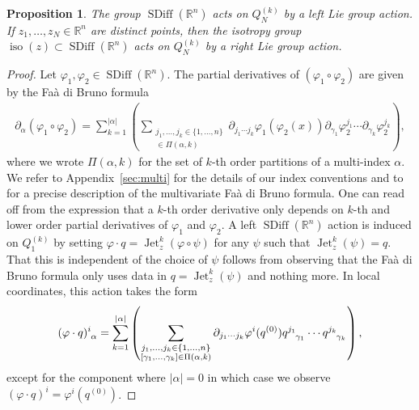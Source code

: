 \documentclass[12pt]{amsart}
\newcommand{\R}{\ensuremath{\mathbb{R}}}
\newtheorem{prop}[thm]{Proposition}
\DeclareMathOperator{\SDiff}{SDiff}
\DeclareMathOperator{\Jet}{Jet}
\DeclareMathOperator{\iso}{iso}
\begin{document}
  \begin{prop}
    The group $\SDiff(\R^n)$ acts on $Q_N^{(k)}$ by a left Lie group
    action.  If $z_1,\dots,z_N \in \R^n$ are distinct points,
    then the isotropy group $\iso(z) \subset \SDiff(\R^n)$
    acts on $Q_N^{(k)}$ by a right Lie group action. \label{HL_action_prop}
  \end{prop}
  \begin{proof}
    Let $\varphi_1,\varphi_2 \in \SDiff(\R^n)$.
    The partial derivatives of $(\varphi_1 \circ \varphi_2)$
    are given by the Fa\`a di Bruno formula
    \begin{align*}
      \partial_\alpha( \varphi_1 \circ \varphi_2) = \sum_{k=1}^{|\alpha|}
      \left(
        \sum_{
        \substack{
          j_1,\dots,j_k \in \{1,\dots,n\} \\
          [\gamma_1,\dots,\gamma_k] \in \Pi(\alpha , k)
          }
          }
          \partial_{j_1 \cdots j_k} \varphi_1(\varphi_2(x))
          \partial_{\gamma_1} \varphi_2^{j_1} \cdots
          \partial_{\gamma_k} \varphi_2^{j_k}
        \right),
    \end{align*}
where we wrote $\Pi(\alpha, k)$ for the set of $k$-th order partitions of a multi-index $\alpha$. We refer to Appendix~\ref{sec:multi} for the details of our index conventions and to \cite{ConstantineSavits1996,Jacobs2014b} for a
    precise description of the multivariate Fa\`a di Bruno formula.
    One can read off   from the expression that
    a $k$-th order derivative only depends on $k$-th 
    and lower order
    partial derivatives of $\varphi_1$ and $\varphi_2$.
        A left $\SDiff(\R^n)$ action is induced on $Q_1^{(k)}$ by
    setting $\varphi \cdot q = \Jet^k_z( \varphi \circ \psi)$
    for any $\psi$ such that $\Jet^k_z(\psi) = q$.
    That this is independent of the choice of $\psi$ follows
    from observing that the Fa\`a di Bruno formula
    only uses data in $q = \Jet^k_z(\psi)$ and nothing more.
    In local coordinates, this action takes the form
    \begin{align*}
    (\varphi \cdot q)\indices{^i_\alpha} =
     \sum_{k=1}^{|\alpha|}
      \left(
        \sum_{
        \substack{
          j_1,\dots,j_k \in \{1,\dots,n\} \\
          [\gamma_1,\dots,\gamma_k] \in \Pi(\alpha , k)
          }
          }
          \partial_{j_1 \cdots j_k} \varphi^i(q^{(0)})
          q\indices{^{j_1}_{\gamma_1}} \cdots
          q\indices{^{j_k}_{\gamma_k}}
        \right),
    \end{align*}
    except for the component where $|\alpha | = 0$ in which case we observe $(\varphi \cdot q)^i = \varphi^i(q^{(0)})$.

\end{proof}
\end{document}
